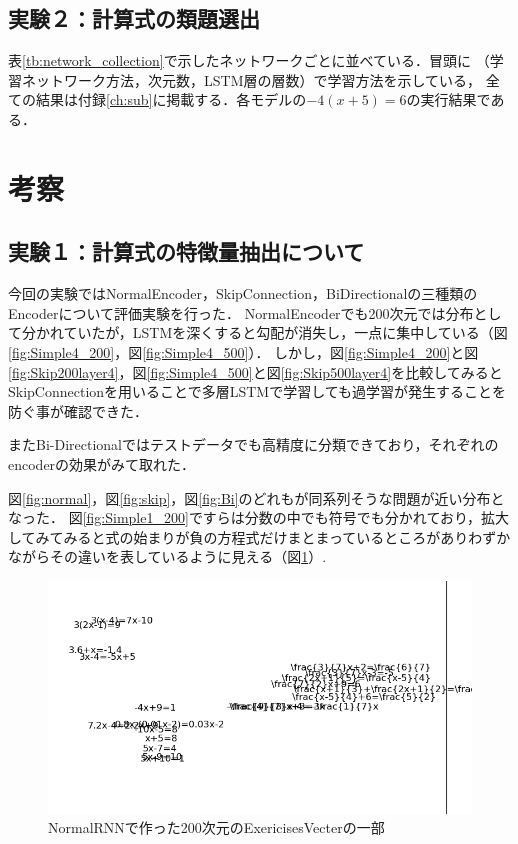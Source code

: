 \documentclass[a4j,11pt,report]{jsbook}
\begin{document}
\clearpage
\subsection{実験２：計算式の類題選出}
表\ref{tb:network_collection}で示したネットワークごとに並べている．冒頭に
（学習ネットワーク方法，次元数，LSTM層の層数）で学習方法を示している，
全ての結果は付録\ref{ch:sub}に掲載する．各モデルの$-4(x+5)=6$の実行結果である．

\clearpage

\section{考察}

\subsection{実験１：計算式の特徴量抽出について}
今回の実験ではNormalEncoder，SkipConnection，BiDirectionalの三種類のEncoderについて評価実験を行った．
NormalEncoderでも200次元では分布として分かれていたが，LSTMを深くすると勾配が消失し，一点に集中している（図\ref{fig:Simple4_200}，図\ref{fig:Simple4_500}）．
しかし，図\ref{fig:Simple4_200}と図\ref{fig:Skip200layer4}，図\ref{fig:Simple4_500}と図\ref{fig:Skip500layer4}を比較してみると
SkipConnectionを用いることで多層LSTMで学習しても過学習が発生することを防ぐ事が確認できた．

またBi-Directionalではテストデータでも高精度に分類できており，それぞれのencoderの効果がみて取れた．

図\ref{fig:normal}，図\ref{fig:skip}，図\ref{fig:Bi}のどれもが同系列そうな問題が近い分布となった．
図\ref{fig:Simple1_200}ですらは分数の中でも符号でも分かれており，拡大してみてみると式の始まりが負の方程式だけまとまっているところがありわずかながらその違いを表しているように見える（図\ref{fig:normal200cut}）.


\begin{center}
  \begin{figure}[H]
    \centering
    \includegraphics[width=\linewidth]{image/detial/pca_formula_EV_final_22x200_1_cut.png}
    \caption{NormalRNNで作った200次元のExericisesVecterの一部}
    \label{fig:normal200cut}
  \end{figure}
\end{center}
\end{document}
